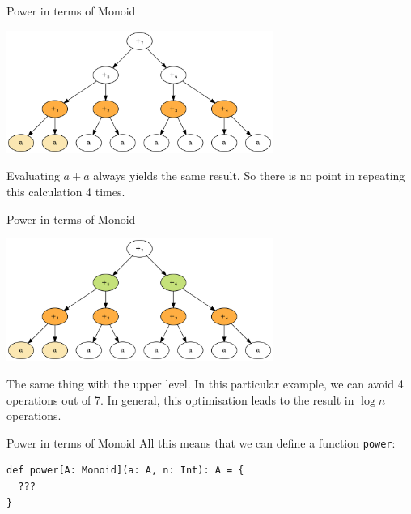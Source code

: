 \documentclass[presentation,aspectratio=169,smaller]{beamer}
\begin{document}
\begin{frame}[label={sec:org86ec6a4}]{Power in terms of Monoid}
\begin{center}
\includegraphics[height=4cm]{.dot/fold-power-2.png}
\end{center}

Evaluating \(a + a\) always yields the same result. So there is no point in
repeating this calculation 4 times.
\end{frame}

\begin{frame}[label={sec:orgdc5e625}]{Power in terms of Monoid}
\begin{center}
\includegraphics[height=4cm]{.dot/fold-power-3.png}
\end{center}

The same thing with the upper level. In this particular example, we can avoid 4
operations out of 7. In general, this optimisation leads to the result in \(\log
n\) operations.
\end{frame}

\begin{frame}[label={sec:orgac3b589},fragile]{Power in terms of Monoid}
 All this means that we can define a function \texttt{power}:

\begin{verbatim}
def power[A: Monoid](a: A, n: Int): A = {
  ???
}
\end{verbatim}
\end{frame}
\end{document}
